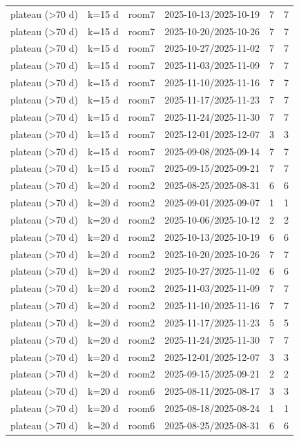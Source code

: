 \begin{tabular}{llllll}
plateau (>70 d) & k=15 d & room7 & 2025-10-13/2025-10-19 & 7 & 7 \\
plateau (>70 d) & k=15 d & room7 & 2025-10-20/2025-10-26 & 7 & 7 \\
plateau (>70 d) & k=15 d & room7 & 2025-10-27/2025-11-02 & 7 & 7 \\
plateau (>70 d) & k=15 d & room7 & 2025-11-03/2025-11-09 & 7 & 7 \\
plateau (>70 d) & k=15 d & room7 & 2025-11-10/2025-11-16 & 7 & 7 \\
plateau (>70 d) & k=15 d & room7 & 2025-11-17/2025-11-23 & 7 & 7 \\
plateau (>70 d) & k=15 d & room7 & 2025-11-24/2025-11-30 & 7 & 7 \\
plateau (>70 d) & k=15 d & room7 & 2025-12-01/2025-12-07 & 3 & 3 \\
plateau (>70 d) & k=15 d & room7 & 2025-09-08/2025-09-14 & 7 & 7 \\
plateau (>70 d) & k=15 d & room7 & 2025-09-15/2025-09-21 & 7 & 7 \\
plateau (>70 d) & k=20 d & room2 & 2025-08-25/2025-08-31 & 6 & 6 \\
plateau (>70 d) & k=20 d & room2 & 2025-09-01/2025-09-07 & 1 & 1 \\
plateau (>70 d) & k=20 d & room2 & 2025-10-06/2025-10-12 & 2 & 2 \\
plateau (>70 d) & k=20 d & room2 & 2025-10-13/2025-10-19 & 6 & 6 \\
plateau (>70 d) & k=20 d & room2 & 2025-10-20/2025-10-26 & 7 & 7 \\
plateau (>70 d) & k=20 d & room2 & 2025-10-27/2025-11-02 & 6 & 6 \\
plateau (>70 d) & k=20 d & room2 & 2025-11-03/2025-11-09 & 7 & 7 \\
plateau (>70 d) & k=20 d & room2 & 2025-11-10/2025-11-16 & 7 & 7 \\
plateau (>70 d) & k=20 d & room2 & 2025-11-17/2025-11-23 & 5 & 5 \\
plateau (>70 d) & k=20 d & room2 & 2025-11-24/2025-11-30 & 7 & 7 \\
plateau (>70 d) & k=20 d & room2 & 2025-12-01/2025-12-07 & 3 & 3 \\
plateau (>70 d) & k=20 d & room2 & 2025-09-15/2025-09-21 & 2 & 2 \\
plateau (>70 d) & k=20 d & room6 & 2025-08-11/2025-08-17 & 3 & 3 \\
plateau (>70 d) & k=20 d & room6 & 2025-08-18/2025-08-24 & 1 & 1 \\
plateau (>70 d) & k=20 d & room6 & 2025-08-25/2025-08-31 & 6 & 6 \\

\end{tabular}
